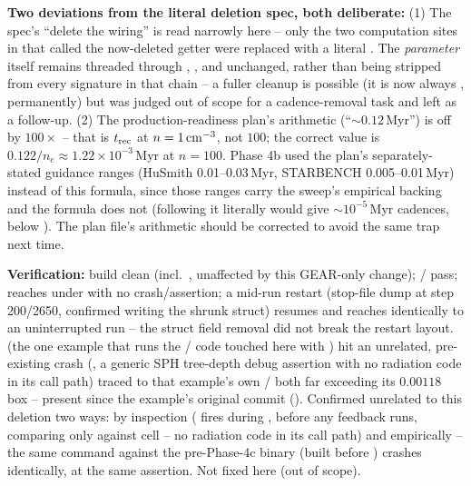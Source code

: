 \textbf{Two deviations from the literal deletion spec, both
deliberate:} (1) The spec's ``delete the  wiring''
is read narrowly here -- only the two computation sites in
 that called the now-deleted
getter were replaced with a literal . The 
\emph{parameter} itself remains threaded through
, ,
and  unchanged, rather than being
stripped from every signature in that chain -- a fuller cleanup is
possible (it is now always , permanently) but was judged
out of scope for a cadence-removal task and left as a follow-up.
(2) The production-readiness plan's arithmetic
(``$\sim0.12$\,Myr'') is off by $100\times$
-- that is $t_{\rm rec}$ at $n=1\,{\rm cm^{-3}}$, not $100$; the
correct value is $0.122/n_e\approx1.22\times10^{-3}\,$Myr at
$n=100$. Phase 4b used the plan's separately-stated guidance ranges
(HuSmith 0.01--0.03\,Myr, STARBENCH 0.005--0.01\,Myr) instead of this
formula, since those ranges carry the sweep's empirical backing and
the formula does not (following it literally would give
$\sim10^{-5}\,$Myr cadences, below ).
The plan file's arithmetic should be corrected to avoid the same trap
next time.

\textbf{Verification:} build clean (incl.\ , unaffected by
this GEAR-only change); /
 pass;
 reaches  under
 with no crash/assertion; a mid-run
restart (stop-file dump at step 200/2650, 
confirmed writing the shrunk struct) resumes and reaches
 identically to an uninterrupted run -- the struct
field removal did not break the restart layout.
 (the one example that runs the
/
code touched here with ) hit an unrelated,
pre-existing crash (, a
generic SPH tree-depth debug assertion with no radiation code in its
call path) traced to that example's own / both
far exceeding its $0.00118$ box -- present since the example's original
commit (). Confirmed unrelated to this deletion two
ways: by inspection ( fires during
, before any feedback runs, comparing
only  against cell  -- no
radiation code in its call path) and empirically -- the same command
against the pre-Phase-4c binary (built before )
crashes identically, at the same assertion. Not fixed here (out of
scope).
